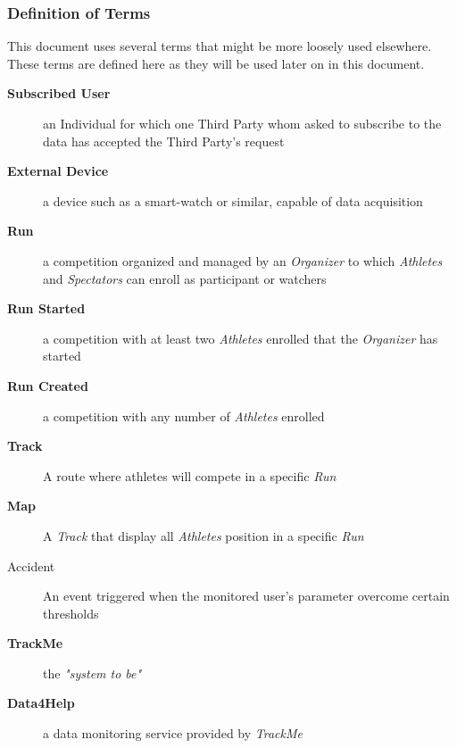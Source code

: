 \documentclass[a4paper]{article}
\begin{document}
            \subsubsection{Definition of Terms}
            This document uses several terms that might be more loosely used elsewhere. These terms are defined here as they will be used later on in this document.
                \begin{description}
                    \item[\textbf{Subscribed User}] an Individual for which one Third Party whom asked to subscribe to the data has accepted the Third Party's request
                    
                    \item[\textbf{External Device}] a device such as a smart-watch or similar, capable of data acquisition
                    
                    \item[\textbf{Run}] a competition organized and managed by an \textit{Organizer} to which \textit{Athletes} and \textit{Spectators} can enroll as participant or watchers
                    
                    \item[\textbf{Run Started}] a competition with at least two \textit{Athletes} enrolled that the \textit{Organizer} has started
                    
                    \item[\textbf{Run Created}] a competition with any number of \textit{Athletes} enrolled
                    
                    \item[\textbf{Track}] A route where athletes will compete in a specific \textit{Run}
                    
                    \item[\textbf{Map}] A \textit{Track} that display all \textit{Athletes} position in a specific \textit{Run}
                    
                    \item[Accident] An event triggered when the monitored user's parameter overcome certain thresholds
                    
                    \item[\textbf{TrackMe}] the \textit{"system to be"}
                    
                    \item[\textbf{Data4Help}] a data monitoring service provided by \textit{TrackMe}
                    

\end{description}
\end{document}

